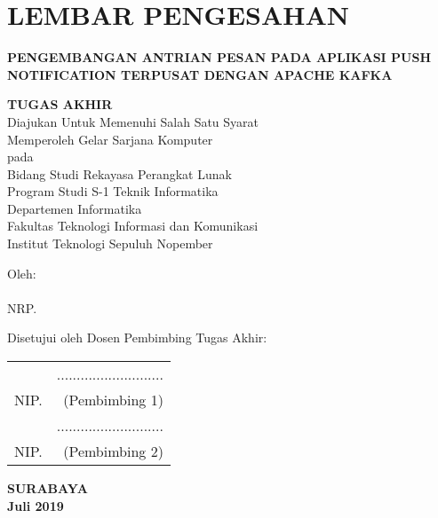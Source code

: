 \chapter{LEMBAR PENGESAHAN}
\small

\begin{center}
	\textbf{\MakeUppercase{Pengembangan Antrian Pesan pada Aplikasi Push Notification Terpusat dengan Apache Kafka}}
	\vspace*{0.3em}
	
	\textbf{TUGAS AKHIR} \\
	Diajukan Untuk Memenuhi Salah Satu Syarat\\
	Memperoleh Gelar Sarjana Komputer\\
	pada\\
	Bidang Studi Rekayasa Perangkat Lunak\\
	Program Studi S-1 Teknik Informatika\\
	Departemen Informatika\\
	Fakultas Teknologi Informasi dan Komunikasi \\
	Institut Teknologi Sepuluh Nopember
	
	\vspace*{0.3em}
	
	Oleh:\\
	\textbf{\penulis} \\
	NRP. \nrp
	
	\vspace*{1.1em}
\end{center}

Disetujui oleh Dosen Pembimbing Tugas Akhir: \\
\vspace*{1.3em}

\begin{tabularx}{\linewidth}{ @{}l r }
	\pembimbingsatu & ........................... \vspace*{1.4em} \\
	NIP. \nikpembimbingsatu & (Pembimbing 1) \vspace*{2.6em} \\
	
	\pembimbingdua & ........................... \vspace*{1.4em} \\
	NIP. \nikpembimbingdua & (Pembimbing 2) \vspace*{0.9em}
\end{tabularx}

\begin{center}
	\textbf {SURABAYA} \\
	\textbf {Juli 2019}
\end{center}

\normalsize
\cleardoublepage